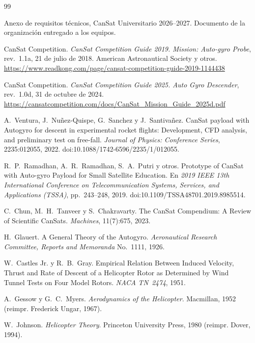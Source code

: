 \begin{thebibliography}{99}

 Anexo de requisitos técnicos, CanSat Universitario 2026--2027.
  Documento de la organización entregado a los equipos.

 CanSat Competition. \emph{CanSat Competition Guide 2019. Mission:
  Auto-gyro Probe}, rev.~1.1a, 21 de julio de 2018. American Astronautical Society y
  otros. \url{https://www.readkong.com/page/cansat-competition-guide-2019-1144438}

 CanSat Competition. \emph{CanSat Competition Guide 2025. Auto Gyro
  Descender}, rev.~1.0d, 31 de octubre de 2024.
  \url{https://cansatcompetition.com/docs/CanSat_Mission_Guide_2025d.pdf}

 A.~Ventura, J.~Nuñez-Quispe, G.~Sanchez y J.~Santivañez.
  CanSat payload with Autogyro for descent in experimental rocket flights: Development,
  CFD analysis, and preliminary test on free-fall. \emph{Journal of Physics: Conference
  Series}, 2235:012055, 2022. doi:10.1088/1742-6596/2235/1/012055.

 R.~P.~Ramadhan, A.~R.~Ramadhan, S.~A.~Putri y otros. Prototype of
  CanSat with Auto-gyro Payload for Small Satellite Education. En \emph{2019 IEEE 13th
  International Conference on Telecommunication Systems, Services, and Applications
  (TSSA)}, pp.~243--248, 2019. doi:10.1109/TSSA48701.2019.8985514.

 C.~Chun, M.~H.~Tanveer y S.~Chakravarty. The CanSat Compendium: A
  Review of Scientific CanSats. \emph{Machines}, 11(7):675, 2023.

 H.~Glauert. A General Theory of the Autogyro. \emph{Aeronautical
  Research Committee, Reports and Memoranda} No.~1111, 1926.

 W.~Castles Jr. y R.~B.~Gray. Empirical Relation Between Induced
  Velocity, Thrust and Rate of Descent of a Helicopter Rotor as Determined by Wind Tunnel
  Tests on Four Model Rotors. \emph{NACA TN~2474}, 1951.

 A.~Gessow y G.~C.~Myers. \emph{Aerodynamics of the Helicopter}.
  Macmillan, 1952 (reimpr. Frederick Ungar, 1967).

 W.~Johnson. \emph{Helicopter Theory}. Princeton University Press,
  1980 (reimpr. Dover, 1994).


\end{thebibliography}
